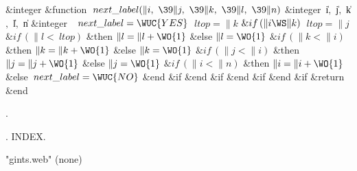 \WY\WP {}%
\7
\&{integer} \&{function} \1$\>{next\_label}(\|i,\ \39\|j,\ \39\|k,\ \39\|l,\ %
\39\|n)$\2\1\6
\&{integer}~\1\|i$,$ \|j$,$ \|k$,$ \|l$,$ \|n\2\7
\&{integer}~\1\2\7
$\>{next\_label}=\WUC{YES}$\6
$\>{ltop}=\|k$\6
$\&{if}\,(\|i\WS\|k)$\1\6
$\>{ltop}=\|j$\2\7
$\&{if}\,(\|l<\>{ltop})$ \&{then}\1\6
$\|l=\|l+\WO{1}$\2\6
\&{else}\1\6
$\|l=\WO{1}$\6
$\&{if}\,(\|k<\|i)$ \&{then}\1\6
$\|k=\|k+\WO{1}$\2\6
\&{else}\1\6
$\|k=\WO{1}$\6
$\&{if}\,(\|j<\|i)$ \&{then}\1\6
$\|j=\|j+\WO{1}$\2\6
\&{else}\1\6
$\|j=\WO{1}$\6
$\&{if}\,(\|i<\|n)$ \&{then}\1\6
$\|i=\|i+\WO{1}$\2\6
\&{else}\1\6
$\>{next\_label}=\WUC{NO}$\2\6
\&{end} \&{if}\2\6
\&{end} \&{if}\2\6
\&{end} \&{if}\2\6
\&{end} \&{if}\6
\&{return}\2\6
\&{end}\WY\Wendc
\fi %

.

\fi %

.  INDEX.
\fi %




  {"gints.web"} {(none)}
 {\Fortran}


\FWEBend
